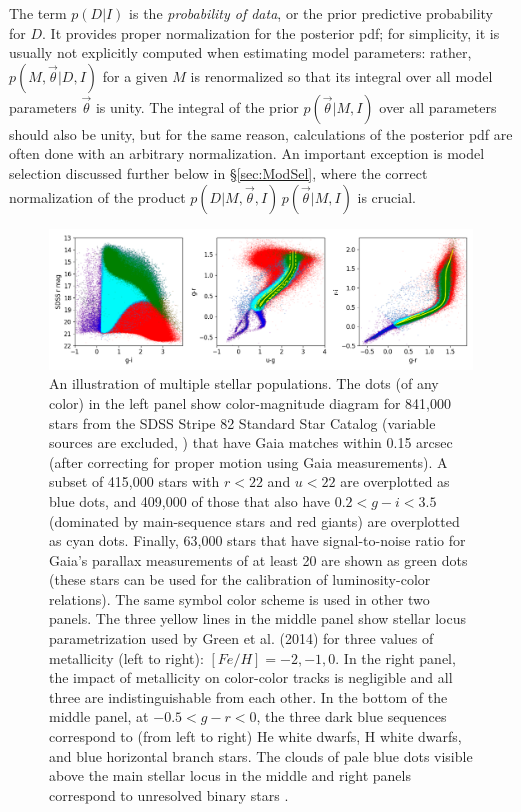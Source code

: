 The term $p(D|I)$ is the {\it probability of data}, or the prior predictive probability for $D$. 
It provides proper normalization for the posterior  pdf; for simplicity, it is usually not explicitly computed
when estimating model parameters: rather, $p(M,\vec{\theta}|D,I)$ for a given $M$
is renormalized so that
its integral over all model parameters $\vec{\theta}$ is unity.  The integral of the prior $p(\vec{\theta}|M,I)$
over all parameters should also be unity, but for the same reason, calculations of the posterior pdf are
often done with an arbitrary normalization. An important exception is model selection discussed further
below in \S\ref{sec:ModSel}, where the correct normalization of the product $p(D|M,\vec{\theta},I) \, p(\vec{\theta}|M,I)$ is crucial.  


\begin{figure}[t!]
\includegraphics[width=1.0\textwidth,angle=0]{figures/plot3diagsData.png} 
\caption{An illustration of multiple stellar populations. The dots (of
any color) in the left panel show color-magnitude diagram for 841,000 stars from the SDSS Stripe 82 Standard Star Catalog
(variable sources are excluded, \citealt{2021MNRAS.505.5941T}) that have Gaia matches within 0.15 arcsec (after correcting for proper motion using Gaia measurements). A subset of 415,000 stars with $r < 22$ and $u<22$ are overplotted as blue dots, and 409,000 of those that also have $0.2 < g-i < 3.5$ (dominated by main-sequence stars and red giants) are overplotted as cyan dots. Finally, 63,000 stars that have signal-to-noise ratio for Gaia’s parallax measurements of at least 20 are shown as green dots (these stars can be used for the calibration of luminosity-color relations). The same symbol color scheme is used in other two panels. The three yellow lines in the middle panel show stellar locus parametrization used by Green et al. (2014) for three values of metallicity (left to right): $[Fe/H] = -2, -1, 0$. In the right panel, the impact of metallicity on color-color tracks is negligible and all three are indistinguishable from each other. In the bottom of the middle panel, at $-0.5 < g-r < 0$, the three dark blue sequences correspond to (from left to right) He white dwarfs, H white dwarfs, and blue horizontal branch stars. The clouds of pale blue dots visible above the main stellar locus in the middle and right panels correspond to unresolved binary stars \citep{2004ApJ...615L.141S}.} \label{fig:3dataDiags}
\end{figure}



